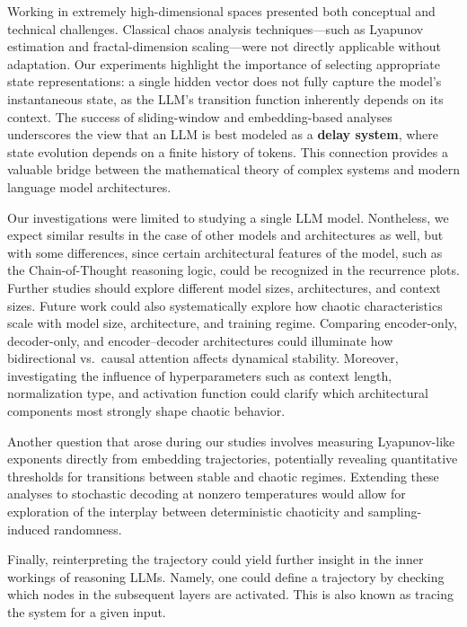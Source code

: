 \documentclass[a4paper,12pt]{article}
\begin{document}
Working in extremely high-dimensional spaces presented both conceptual and technical challenges. Classical chaos analysis techniques—such as Lyapunov estimation and fractal-dimension scaling—were not directly applicable without adaptation. Our experiments highlight the importance of selecting appropriate state representations: a single hidden vector does not fully capture the model’s instantaneous state, as the LLM’s transition function inherently depends on its context. The success of sliding-window and embedding-based analyses underscores the view that an LLM is best modeled as a \textbf{delay system}, where state evolution depends on a finite history of tokens. This connection provides a valuable bridge between the mathematical theory of complex systems and modern language model architectures.

Our investigations were limited to studying a single LLM model. Nontheless, we expect similar results in the case of other models and architectures as well, but with some differences, since certain architectural features of the model, such as the Chain-of-Thought reasoning logic, could be recognized in the recurrence plots. Further studies should explore different model sizes, architectures, and context sizes.
Future work could also systematically explore how chaotic characteristics scale with model size, architecture, and training regime. Comparing encoder-only, decoder-only, and encoder–decoder architectures could illuminate how bidirectional vs.\ causal attention affects dynamical stability. Moreover, investigating the influence of hyperparameters such as context length, normalization type, and activation function could clarify which architectural components most strongly shape chaotic behavior.

Another question that arose during our studies involves measuring Lyapunov-like exponents directly from embedding trajectories, potentially revealing quantitative thresholds for transitions between stable and chaotic regimes. Extending these analyses to stochastic decoding at nonzero temperatures would allow for exploration of the interplay between deterministic chaoticity and sampling-induced randomness.

Finally, reinterpreting the trajectory could yield further insight in the inner workings of reasoning LLMs. Namely, one could define a trajectory by checking which nodes in the subsequent layers are activated. This is also known as tracing the system for a given input.


\end{document}

